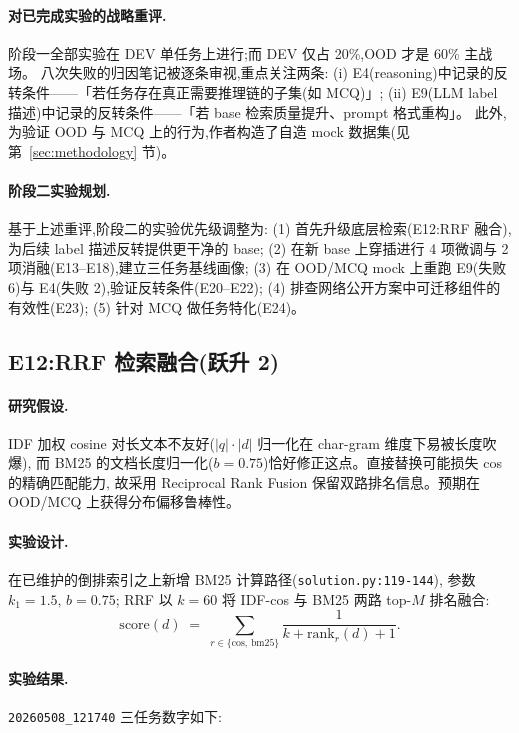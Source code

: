 \documentclass[11pt,a4paper]{ctexart}
\begin{document}
\paragraph{对已完成实验的战略重评.}阶段一全部实验在 DEV 单任务上进行;而 DEV 仅占 20\%,OOD 才是 60\% 主战场。
八次失败的归因笔记被逐条审视,重点关注两条:
(i) E4(reasoning)中记录的反转条件——「若任务存在真正需要推理链的子集(如 MCQ)」;
(ii) E9(LLM label 描述)中记录的反转条件——「若 base 检索质量提升、prompt 格式重构」。
此外,为验证 OOD 与 MCQ 上的行为,作者构造了自造 mock 数据集(见第~\ref{sec:methodology} 节)。

\paragraph{阶段二实验规划.}基于上述重评,阶段二的实验优先级调整为:
(1) 首先升级底层检索(E12:RRF 融合),为后续 label 描述反转提供更干净的 base;
(2) 在新 base 上穿插进行 4 项微调与 2 项消融(E13--E18),建立三任务基线画像;
(3) 在 OOD/MCQ mock 上重跑 E9(失败 6)与 E4(失败 2),验证反转条件(E20--E22);
(4) 排查网络公开方案中可迁移组件的有效性(E23);
(5) 针对 MCQ 做任务特化(E24)。

\subsection{E12:RRF 检索融合(跃升 2)}

\paragraph{研究假设.}IDF 加权 cosine 对长文本不友好($|q|\cdot|d|$ 归一化在 char-gram 维度下易被长度吹爆),
而 BM25 的文档长度归一化($b=0.75$)恰好修正这点。直接替换可能损失 cos 的精确匹配能力,
故采用 Reciprocal Rank Fusion 保留双路排名信息。预期在 OOD/MCQ 上获得分布偏移鲁棒性。

\paragraph{实验设计.}在已维护的倒排索引之上新增 BM25 计算路径(\texttt{solution.py:119-144}),
参数 $k_1=1.5,\,b=0.75$;
RRF 以 $k=60$ 将 IDF-cos 与 BM25 两路 top-$M$ 排名融合:
\[
\mathrm{score}(d) \;=\; \sum_{r \in \{\text{cos},\,\text{bm25}\}}\frac{1}{k + \mathrm{rank}_r(d) + 1}.
\]

\paragraph{实验结果.}\texttt{20260508\_121740} 三任务数字如下:
\end{document}

